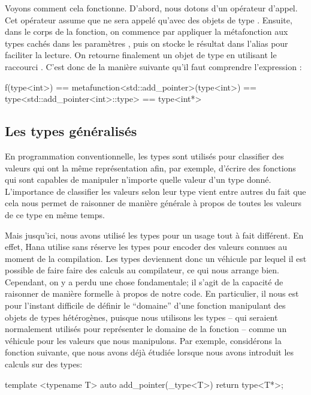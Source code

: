 Voyons comment cela fonctionne. D'abord, nous dotons 
d'un opérateur d'appel. Cet opérateur assume que  ne
sera appelé qu'avec des objets de type . Ensuite, dans le corps
de la fonction, on commence par appliquer la métafonction  aux types
 cachés dans les paramètres , puis on stocke le
résultat dans l'alias  pour faciliter la lecture. On retourne
finalement un objet de type  en utilisant le raccourci
. C'est donc de la manière suivante qu'il faut comprendre
l'expression :
\begin{cpp}
    f(type<int>) == metafunction<std::add_pointer>(type<int>)
                 == type<std::add_pointer<int>::type>
                 == type<int*>
\end{cpp}


\subsection{Les types généralisés}
En programmation conventionnelle, les types sont utilisés pour classifier
des valeurs qui ont la même représentation afin, par exemple, d'écrire
des fonctions qui sont capables de manipuler n'importe quelle valeur
d'un type donné. L'importance de classifier les valeurs selon leur type
vient entre autres du fait que cela nous permet de raisonner de manière
générale à propos de toutes les valeurs de ce type en même temps.

Mais jusqu'ici, nous avons utilisé les types pour un usage tout à fait
différent. En effet, Hana utilise sans réserve les types pour encoder des
valeurs connues au moment de la compilation. Les types deviennent donc un
véhicule par lequel il est possible de faire faire des calculs au compilateur,
ce qui nous arrange bien. Cependant, on y a perdu une chose fondamentale; il
s'agit de la capacité de raisonner de manière formelle à propos de notre code.
En particulier, il nous est pour l'instant difficile de définir le ``domaine''
d'une fonction manipulant des objets de types hétérogènes, puisque nous
utilisons les types -- qui seraient normalement utilisés pour représenter le
domaine de la fonction -- comme un véhicule pour les valeurs que nous
manipulons. Par exemple, considérons la fonction suivante, que nous avons
déjà étudiée lorsque nous avons introduit les calculs sur des types:
\begin{cpp}
    template <typename T>
    auto add_pointer(_type<T>) {
        return type<T*>;
    }
\end{cpp}


